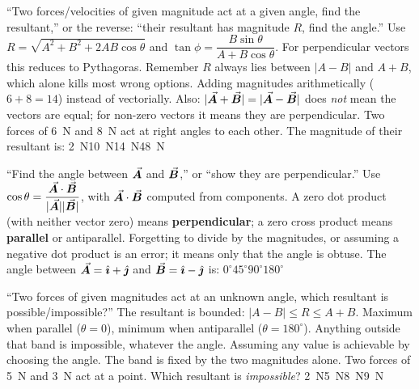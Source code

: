 {``Two forces/velocities of given magnitude act at a given angle, find the resultant,'' or the reverse:
``their resultant has magnitude $R$, find the angle.''}
{Use $R=\sqrt{A^2+B^2+2AB\cos\theta}$ and $\tan\phi=\dfrac{B\sin\theta}{A+B\cos\theta}$. For
perpendicular vectors this reduces to Pythagoras. Remember $R$ always lies between $|A-B|$ and $A+B$, which
alone kills most wrong options.}
{Adding magnitudes arithmetically ($6+8=14$) instead of vectorially. Also: $|\vec{\bm{A}}+\vec{\bm{B}}|=|\vec{\bm{A}}-\vec{\bm{B}}|$
does \emph{not} mean the vectors are equal; for non-zero vectors it means they are perpendicular.}
{Two forces of \SI{6}{N} and \SI{8}{N} act at right angles to each other. The magnitude of their
resultant is:}
{\SI{2}{N}}{\SI{10}{N}}{\SI{14}{N}}{\SI{48}{N}}

{``Find the angle between $\vec{\bm{A}}$ and $\vec{\bm{B}}$,'' or ``show they are perpendicular.''}
{Use $\cos\theta=\dfrac{\vec{\bm{A}}\cdot\vec{\bm{B}}}{|\vec{\bm{A}}||\vec{\bm{B}}|}$, with $\vec{\bm{A}}\cdot\vec{\bm{B}}$ computed from
components. A zero dot product (with neither vector zero) means \textbf{perpendicular}; a zero cross
product means \textbf{parallel} or antiparallel.}
{Forgetting to divide by the magnitudes, or assuming a negative dot product is an error; it
means only that the angle is obtuse.}
{The angle between $\vec{\bm{A}}=\hat{\bm{\imath}}+\hat{\bm{\jmath}}$ and $\vec{\bm{B}}=\hat{\bm{\imath}}-\hat{\bm{\jmath}}$ is:}
{$0^\circ$}{$45^\circ$}{$90^\circ$}{$180^\circ$}

{``Two forces of given magnitudes act at an unknown angle, which resultant is possible/impossible?''}
{The resultant is bounded: $|A-B|\le R\le A+B$. Maximum when parallel ($\theta=0$), minimum when
antiparallel ($\theta=180^\circ$). Anything outside that band is impossible, whatever the angle.}
{Assuming any value is achievable by choosing the angle. The band is fixed by the two magnitudes alone.}
{Two forces of \SI{5}{N} and \SI{3}{N} act at a point. Which resultant is \emph{impossible}?}
{\SI{2}{N}}{\SI{5}{N}}{\SI{8}{N}}{\SI{9}{N}}

